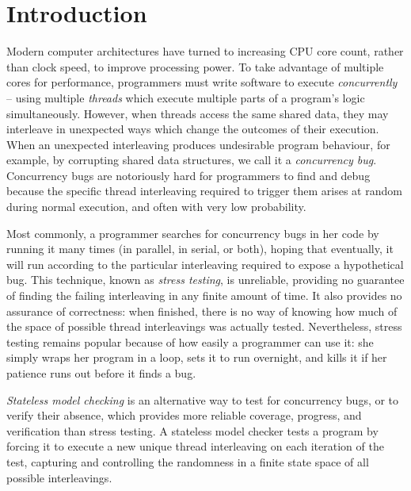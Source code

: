\documentclass[12pt]{cmuthesis}
\begin{document}
\chapter{Introduction}

Modern computer architectures have turned to increasing CPU core count, rather than clock speed, to improve processing power.
To take advantage of multiple cores for performance, programmers must write software to execute {\em concurrently} --
using multiple {\em threads} which execute multiple parts of a program's logic simultaneously.
However, when threads access the same shared data, they may interleave in unexpected ways which change the outcomes of their execution.
When an unexpected interleaving produces undesirable program behaviour,
for example, by corrupting shared data structures,
we call it a {\em concurrency bug}.
Concurrency bugs are notoriously hard for programmers to find and debug
because the specific thread interleaving required to trigger them arises at random during normal execution,
and often with very low probability.

Most commonly, a programmer searches for concurrency bugs in her code by running it many times (in parallel, in serial, or both),
hoping that eventually, it will run according to the particular interleaving required to expose a hypothetical bug.
This technique, known as {\em stress testing}, is unreliable,
providing no guarantee of finding the failing interleaving in any finite amount of time.
It also provides no assurance of correctness:
when finished, there is no way of knowing how much of the space of possible thread interleavings was actually tested.
Nevertheless, stress testing remains popular because of how easily a programmer can use it:
she simply wraps her program in a loop, sets it to run overnight, and kills it if her patience runs out before it finds a bug.

{\em Stateless model checking} \cite{verisoft} is an alternative way to test for concurrency bugs,
or to verify their absence,
which provides more reliable coverage, progress, and verification than stress testing.
A stateless model checker tests a program by forcing it to execute a new unique thread interleaving on each iteration of the test,
capturing and controlling the randomness in a finite state space of all possible interleavings.
\end{document}
